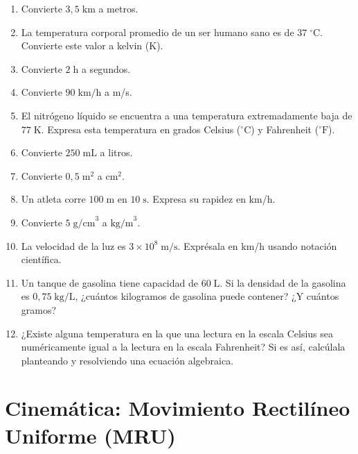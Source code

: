 \documentclass[12pt, letterpaper]{article}
\begin{document}
\begin{enumerate}[leftmargin=*, resume]
  \item \facil{} Convierte $3{,}5\;\text{km}$ a metros.

  \item \facil{} La temperatura corporal promedio de un ser humano sano es de $37\;^\circ\text{C}$. Convierte este valor a kelvin (K).

  \item \facil{} Convierte $2\;\text{h}$ a segundos.

  \item \facil{} Convierte $90\;\text{km/h}$ a m/s.

  \item \medio{} El nitrógeno líquido se encuentra a una temperatura extremadamente baja de $77\;\text{K}$. Expresa esta temperatura en grados Celsius ($^\circ\text{C}$) y Fahrenheit ($^\circ\text{F}$).

  \item \medio{} Convierte $250\;\text{mL}$ a litros.

  \item \medio{} Convierte $0{,}5\;\text{m}^2$ a $\text{cm}^2$.

  \item \medio{} Un atleta corre $100\;\text{m}$ en $10\;\text{s}$. Expresa su rapidez en km/h.

  \item \dificil{} Convierte $5\;\text{g/cm}^3$ a $\text{kg/m}^3$.

  \item \dificil{} La velocidad de la luz es $3 \times 10^8\;\text{m/s}$. Exprésala en km/h usando notación científica.

  \item \dificil{} Un tanque de gasolina tiene capacidad de $60\;\text{L}$. Si la densidad de la gasolina es $0{,}75\;\text{kg/L}$, ¿cuántos kilogramos de gasolina puede contener? ¿Y cuántos gramos?

  \item \dificil{} ¿Existe alguna temperatura en la que una lectura en la escala Celsius sea numéricamente igual a la lectura en la escala Fahrenheit? Si es así, calcúlala planteando y resolviendo una ecuación algebraica.
\end{enumerate}


\section{Cinemática: Movimiento Rectilíneo Uniforme (MRU)}
\end{document}
